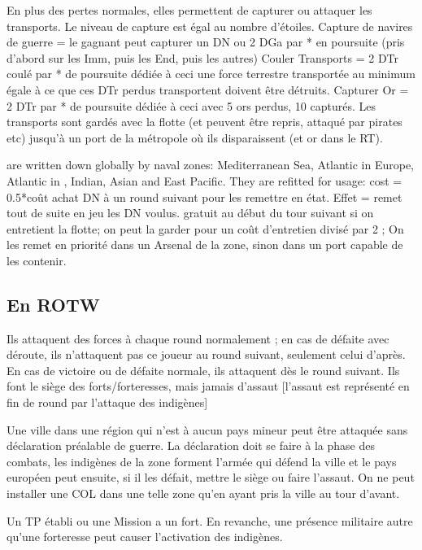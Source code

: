  En plus des pertes normales, elles permettent
de capturer ou attaquer les transports. Le niveau de capture est égal
au nombre d'étoiles.
\bparag Capture de navires de guerre = le gagnant peut capturer un DN ou
2 DGa par * en poursuite        (pris d'abord sur les Imm, puis les End, puis les autres)
\bparag Couler Transports = 2 DTr coulé par * de poursuite dédiée à ceci
       une force terrestre transportée au minimum égale à ce que
       ces DTr perdus transportent doivent être détruits.
\bparag Capturer Or = 2 DTr par * de poursuite dédiée à ceci avec 5 ors perdus, 10 \ducats capturés.
Les transports sont gardés avec la flotte (et peuvent être repris, attaqué par pirates etc)
jusqu'à un port de la métropole où ils disparaissent (et or dans le RT).

  \ND are written down globally by naval zones:
Mediterranean Sea, Atlantic in Europe, Atlantic in \ROTW, Indian, Asian and East Pacific.
They are refitted for usage:
\bparag cost = 0.5*coût achat DN à un round suivant pour les remettre en état.
               Effet = remet tout de suite en jeu les DN voulus.
\bparag gratuit au début du tour suivant si on entretient la flotte;
\bparag on peut la garder  pour un coût d'entretien divisé par 2 ;
\bparag On les remet en priorité dans un Arsenal de la zone, sinon dans un
port capable de les contenir.

\subsection{En ROTW}

Ils attaquent des forces à chaque round normalement ; en cas
de défaite avec déroute, ils n'attaquent pas ce joueur au
round suivant, seulement celui d'après. En cas de victoire
ou de défaite normale, ils attaquent dès le round suivant.
Ils font le siège des forts/forteresses, mais jamais d'assaut
[l'assaut est représenté en fin de round par l'attaque des indigènes]

\aparag Une ville dans une région qui n'est à aucun pays mineur peut
être attaquée sans déclaration préalable de guerre. La déclaration
doit se faire à la phase des combats, les indigènes de la zone
forment l'armée qui défend la ville et le pays européen peut
ensuite, si il les défait, mettre le siège ou faire l'assaut.
On ne peut installer une COL dans une telle zone qu'en ayant
pris la ville au tour d'avant.

\aparag Un TP établi ou une Mission a un fort. En revanche, une présence militaire
autre qu'une forteresse peut causer l'activation des indigènes.

